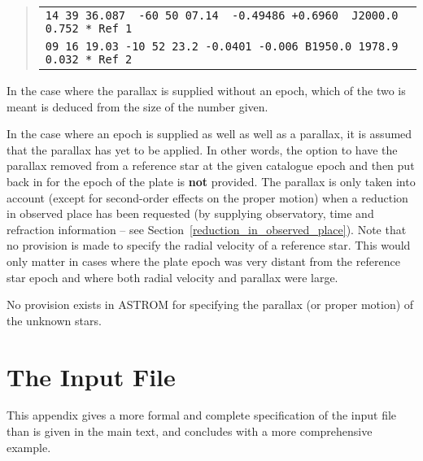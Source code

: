 \documentclass[twoside,11pt]{article}
\newcommand{\xlabel}[1]{}
\renewcommand{\_}{\texttt{\symbol{95}}}
\begin{document}
\goodbreak
\begin{quote}
\begin{small}
\begin{tabular}{|l|}
\hline
\verb|14 39 36.087  -60 50 07.14  -0.49486 +0.6960  J2000.0  0.752 * Ref 1| \\
\verb|09 16 19.03 -10 52 23.2 -0.0401 -0.006 B1950.0 1978.9 0.032 * Ref 2| \\
\hline
\end{tabular}
\end{small}
\end{quote}

In the case where the parallax is supplied without an epoch, which of
the two is meant is deduced from the size of the number given.

In the case where an epoch is supplied as well as well as a parallax,
it is assumed that the parallax has yet to be applied.  In other words,
the option to have the parallax removed from a reference star at the
given catalogue epoch and then put back in for the epoch of the plate
is \textbf{not} provided.  The parallax is only taken into account
(except for second-order effects on the proper motion) when a reduction
in observed place has been requested (by supplying observatory, time and
refraction information -- see Section~\ref{reduction_in_observed_place}).
Note that no provision is made to specify the radial velocity of a
reference star.  This would only matter in cases where the plate epoch
was very distant from the reference star epoch and where both radial
velocity and parallax were large.

No provision exists in ASTROM for specifying the parallax (or proper motion)
of the unknown stars.

\begin{raggedright}


\end{raggedright}


\newpage
\appendix
\section{\xlabel{appendix_the_input_file}The Input File}
\label{appendix_the_input_file}

This appendix gives a more formal and complete specification of
the input file than is given in the main text, and concludes
with a more comprehensive example.
\end{document}
